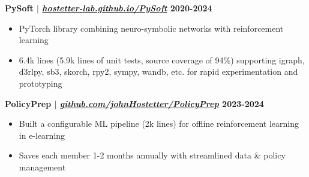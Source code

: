 \documentclass[11pt]{article} %
\begin{document}
\vspace{-4pt}

\noindent\textbf{PySoft\textsuperscript{\dag}  $|$ \href{https://hostetter-lab.github.io/PySoft}{\normalfont\textit{hostetter-lab.github.io/PySoft}} \hfill 2020-2024}
\vspace{-6pt}
\begin{itemize}
\setlength\itemsep{-0.5em}
  \item PyTorch library combining neuro-symbolic networks with reinforcement learning
  \item 6.4k lines (5.9k lines of unit tests, source coverage of 94\%) supporting igraph, d3rlpy, sb3, skorch, rpy2, sympy, wandb, etc. for rapid experimentation and prototyping
\end{itemize}

\vspace{-4pt}


\noindent\textbf{PolicyPrep\textsuperscript{\dag} $|$ \href{https://github.com/johnHostetter/PolicyPrep}{\normalfont\textit{github.com/johnHostetter/PolicyPrep}} \hfill 2023-2024}
\vspace{-6pt}
\begin{itemize}
\setlength\itemsep{-0.5em}
  \item Built a configurable ML pipeline (2k lines) for offline reinforcement learning in e-learning
  \item Saves each member 1-2 months annually with streamlined data \& policy management
\end{itemize}

\vspace{-4pt}
\end{document}
